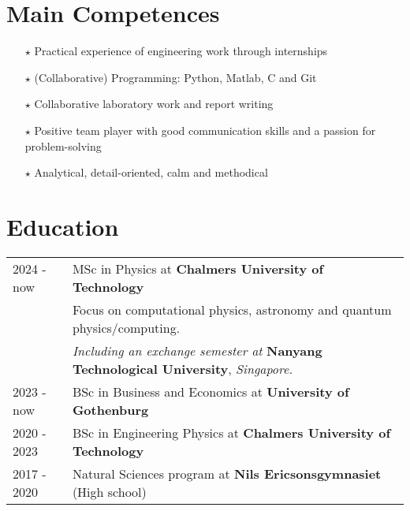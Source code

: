 \documentclass[a4paper,12pt]{article}
\begin{document}
\section{Main Competences}
\begin{itemize}
    \item[$\bm{\star}$] Practical experience of engineering work through internships
    \item[$\bm{\star}$] (Collaborative) Programming: Python, Matlab, C and Git
    \item[$\bm{\star}$] Collaborative laboratory work and report writing
    \item[$\bm{\star}$] Positive team player with good communication skills and a passion for problem-solving
    \item[$\bm{\star}$] Analytical, detail-oriented, calm and methodical
\end{itemize}

\section{Education}
\begin{tabularx}{\linewidth}{@{}l X@{}}	
2024 - now &MSc in Physics at \textbf{Chalmers University of Technology} \hfill \\
&Focus on computational physics, astronomy and quantum physics/computing. \\
&\textit{Including an exchange semester at} \textbf{Nanyang Technological University}, \textit{Singapore.} \\[5pt] 

2023 - now &BSc in Business and Economics at \textbf{University of Gothenburg} \hfill \\[5pt] 

2020 - 2023 &BSc in Engineering Physics at \textbf{Chalmers University of Technology} \hfill \\[5pt] 

2017 - 2020 &Natural Sciences program at \textbf{Nils Ericsonsgymnasiet} (High school) \hfill \\ 
\end{tabularx}

\end{document}
